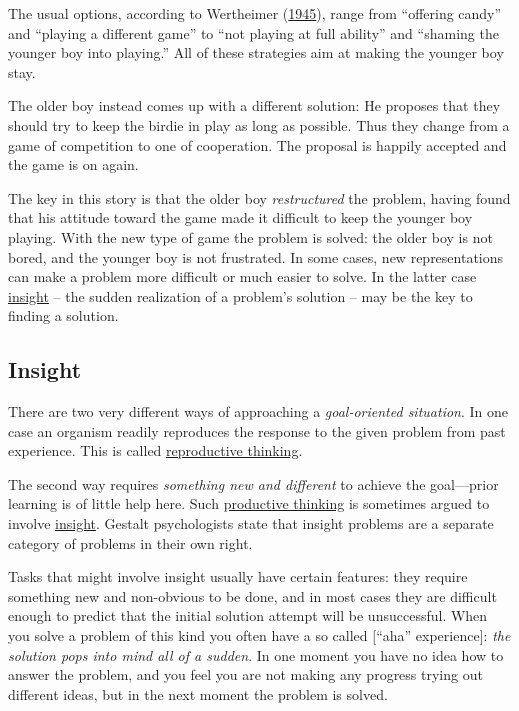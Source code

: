 \documentclass[
]{krantz}
\begin{document}
The usual options, according to Wertheimer (\protect\hyperlink{ref-wertheimer1945productive}{1945}), range from ``offering candy'' and ``playing a different game'' to ``not playing at full ability'' and ``shaming the younger boy into playing.'' All of these strategies aim at making the younger boy stay.

The older boy instead comes up with a different solution: He proposes that they should try to keep the birdie in play as long as possible. Thus they change from a game of competition to one of cooperation. The proposal is happily accepted and the game is on again.

The key in this story is that the older boy \emph{restructured} the problem, having found that his attitude toward the game made it difficult to keep the younger boy playing. With the new type of game the problem is solved: the older boy is not bored, and the younger boy is not frustrated. In some cases, new representations can make a problem more difficult or much easier to solve. In the latter case \protect\hyperlink{insight}{insight} -- the sudden realization of a problem's solution -- may be the key to finding a solution.

\hypertarget{insight}{%
\subsection*{Insight}\label{insight}}


There are two very different ways of approaching a \emph{goal-oriented situation}. In one case an organism readily reproduces the response to the given problem from past experience. This is called \protect\hyperlink{reproductive-thinking}{reproductive thinking}.

The second way requires \emph{something new and different} to achieve the goal---prior learning is of little help here. Such \protect\hyperlink{productive-thinking}{productive thinking} is sometimes argued to involve \protect\hyperlink{insight}{insight}. Gestalt psychologists state that insight problems are a separate category of problems in their own right.

Tasks that might involve insight usually have certain features: they require something new and non-obvious to be done, and in most cases they are difficult enough to predict that the initial solution attempt will be unsuccessful. When you solve a problem of this kind you often have a so called {[}``aha'' experience{]}: \emph{the solution pops into mind all of a sudden}. In one moment you have no idea how to answer the problem, and you feel you are not making any progress trying out different ideas, but in the next moment the problem is solved.
\end{document}
